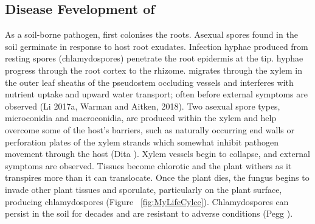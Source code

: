 \subsection{Disease Fevelopment of \Focub}

As a soil-borne pathogen, \Foc first colonises the roots. Asexual spores found in the soil germinate in response to host root exudates. Infection hyphae produced from resting spores (chlamydospores) penetrate the root epidermis at the tip. \Foc hyphae progress through the root cortex to the rhizome. \Foc migrates through the xylem in the outer leaf sheaths of the pseudostem occluding vessels and interferes with nutrient uptake and upward water transport; often before external symptoms are observed (Li \et 2017a, Warman and Aitken, 2018). Two asexual spore types, microconidia and macroconidia, are produced within the xylem and help \Foc overcome some of the host’s barriers, such as naturally occurring end walls or perforation plates of the xylem strands which somewhat inhibit pathogen movement through the host (Dita ). Xylem vessels begin to collapse, and external symptoms are observed. Tissues become chlorotic and the plant withers as it transpires more than it can translocate. Once the plant dies, the fungus begins to invade other plant tissues and sporulate, particularly on the plant surface, producing chlamydospores (Figure ~\ref{fig:MyLifeCylce}). Chlamydospores can persist in the soil for decades and are resistant to adverse conditions (Pegg ).  

